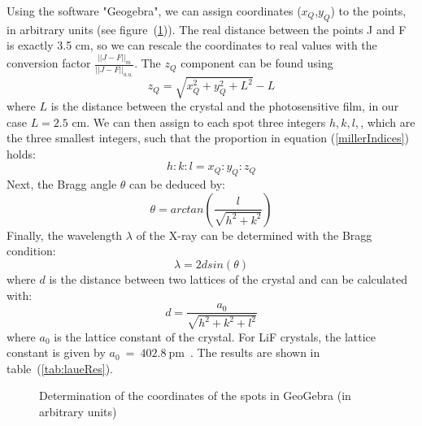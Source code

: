 \documentclass{scrartcl}
\begin{document}
\noindent Using the software "Geogebra", we can assign coordinates ($x_Q$,$y_Q$) to the points, in arbitrary units (see figure~(\ref{fig:laueCoordinates})). The real distance between the points J and F is exactly 3.5 cm, so we can rescale the coordinates to real values with the conversion factor $\frac{||J-F||_m}{||J-F||_{a.u.}}$. The $z_Q$ component can be found using \begin{equation}
    z_Q = \sqrt{x_Q^2+y_Q^2+L^2}-L
\end{equation} where $L$ is the distance between the crystal and the photosensitive film, in our case $L = 2.5$ cm. We  can then assign to each spot three integers $h, k, l,$, which are the three smallest integers, such that the proportion in equation (\ref{millerIndices}) holds: \begin{equation} h:k:l=x_Q:y_Q:z_Q \label{millerIndices} \end{equation} Next, the Bragg angle $\theta$ can be deduced by: \begin{equation}
    \theta = arctan \left( \frac{l}{\sqrt{h^2+k^2}} \right)
\end{equation} Finally, the wavelength $\lambda$ of the X-ray can be determined with the Bragg condition: \begin{equation}
    \lambda = 2dsin(\theta)
\end{equation} where $d$ is the distance between two lattices of the crystal and can be calculated with: \begin{equation}
    d = \frac{a_0}{\sqrt{h^2+k^2+l^2}}
\end{equation} where $a_0$ is the lattice constant of the crystal. For LiF crystals, the lattice constant is given by $a_0~=~402.8~\text{pm}$~\cite{latticeConstant}. The results are shown in table~(\ref{tab:laueRes}).

\begin{figure}[!ht]
    \centering
    \caption{Determination of the coordinates of the spots in GeoGebra (in arbitrary units)}
    \label{fig:laueCoordinates}
\end{figure}
\end{document}
